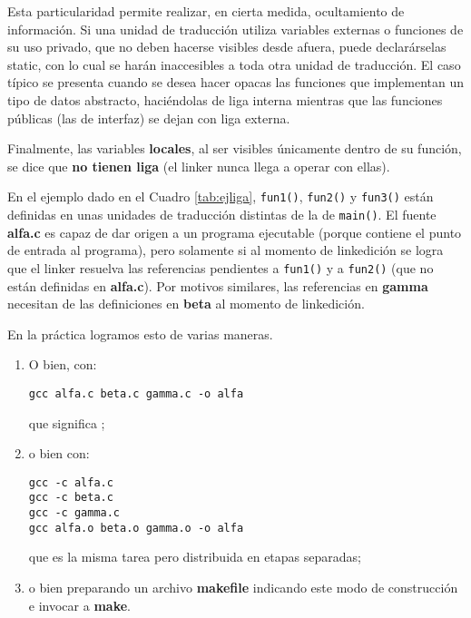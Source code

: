Esta particularidad permite realizar, en cierta medida, ocultamiento de información. Si una unidad de
traducción utiliza variables externas o funciones de su uso privado, que no deben hacerse visibles
desde afuera, puede declarárselas static, con lo cual se harán inaccesibles a toda otra unidad de
traducción. El caso típico se presenta cuando se desea hacer opacas las funciones que implementan un
tipo de datos abstracto, haciéndolas de liga interna mientras que las funciones públicas (las de interfaz)
se dejan con liga externa.

Finalmente, las variables \textbf{locales}, al ser visibles únicamente dentro de su función, se dice que \textbf{no tienen liga} (el linker nunca llega a operar con ellas).

\begin{ejemplo}
En el ejemplo dado en el Cuadro \ref{tab:ejliga}, \lstinline{fun1()}, \lstinline{fun2()} y \lstinline{fun3()} están definidas en unas unidades de traducción distintas de la de \lstinline{main()}. El fuente \textbf{alfa.c} es capaz de dar origen a un programa ejecutable (porque contiene el punto de entrada al programa), pero solamente si al momento de linkedición se logra que el linker resuelva las
referencias pendientes a \lstinline{fun1()} y a \lstinline{fun2()} (que no están definidas en \textbf{alfa.c}). Por motivos similares,
las referencias en \textbf{gamma} necesitan de las definiciones en \textbf{beta} al momento de linkedición.

En la práctica logramos esto de varias maneras.
\begin{enumerate}
	\item O bien, con:
\begin{lstlisting}
gcc alfa.c beta.c gamma.c -o alfa
\end{lstlisting}

que significa ; 
\item o bien con:

\begin{lstlisting}
gcc -c alfa.c
gcc -c beta.c
gcc -c gamma.c
gcc alfa.o beta.o gamma.o -o alfa
\end{lstlisting}

que es la misma tarea pero distribuida en etapas separadas;
\item o bien preparando un archivo \textbf{makefile} indicando este modo de construcción e invocar a \textbf{make}.
\end{enumerate}



\end{ejemplo}
